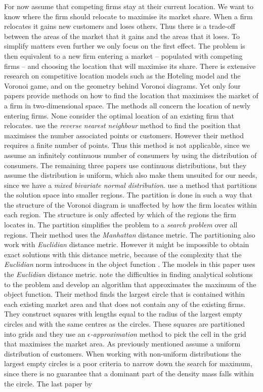 \documentclass[preprint, 12pt]{elsarticle}
\begin{document}
For now assume that competing firms stay at their current location. We want to know where the firm should relocate to maximise its market share. When a firm relocates it gains new customers and loses others. Thus there is a trade-off between the areas of the market that it gains and the areas that it loses. To simplify matters even further we only focus on the first effect. The problem is then equivalent to a new firm entering a market -- populated with competing firms -- and choosing the location that will maximise its share. There is extensive research on competitive location models such as the Hoteling model and the Voronoi game, and on the geometry behind Voronoi diagrams. Yet only four papers provide methods on how to find the location that maximises the market of a firm in two-dimensional space. The methods all concern the location of newly entering firms. None consider the optimal location of an existing firm that relocates. \citet{Cabello_Diaz-Banez_Langerman_Seara_Ventura_2010} use the \emph{reverse nearest neighbour} method to find the position that maximises the number associated points or customers. However their method requires a finite number of points. Thus this method is not applicable, since we assume an infinitely continuous number of consumers by using the distribution of consumers. The remaining three papers use continuous distributions, but they assume the distribution is uniform, which also make them unsuited for our needs, since we have a \emph{mixed bivariate normal distribution}. \citet{Averbakh_Berman_Kalcsics_Krass_2015} use a method that partitions the solution space into smaller regions. The partition is done in such a way that the structure of the Voronoi diagram is unaffected by how the firm locates within each region. The structure is only affected by which of the regions the firm locates in. The partition simplifies the problem to a \emph{search problem} over all regions. Their method uses the \emph{Manhattan} distance metric. The partitioning also work with \emph{Euclidian} distance metric. However it might be impossible to obtain exact solutions with this distance metric, because of the complexity that the \emph{Euclidian} norm introduces in the object function \citep[pp.~409-410]{Averbakh_Berman_Kalcsics_Krass_2015}. The models in this paper uses the \emph{Euclidian} distance metric. \citet{Cheong_Efrat_Har-Peled_2007} note the difficulties in finding analytical solutions to the problem and develop an algorithm that approximates the maximum of the object function. Their method finds the largest circle that is contained within each existing market area and that does not contain any of the existing firms. They construct squares with lengths equal to the radius of the largest empty circles and with the same centres as the circles. These squares are partitioned into grids and they use an \emph{$\epsilon$-approximation} method to pick the cell in the grid that maximises the market area. As previously mentioned \citet{Cheong_Efrat_Har-Peled_2007} assume a uniform distribution of customers. When working with non-uniform distributions the largest empty circles is a poor criteria to narrow down the search for maximum, since there is no guarantee that a dominant part of the density mass falls within the circle. The last paper by 
\end{document}
